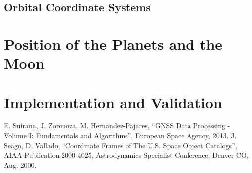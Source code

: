 \documentclass [12pt, a4paper] {article}
\begin{document}
\subsection{Orbital Coordinate Systems}

\newpage
\section{Position of the Planets and the Moon}

\newpage
\section{Implementation and Validation}

\newpage
\begin{thebibliography}{1}
  E. Suirana, J. Zoronoza, M. Hernandez-Pajares,
  ``GNSS Data Processing - Volume I: Fundamentals and Algorithms'',
  European Space Agency, 2013.
  J. Seago, D. Vallado,
  ``Coordinate Frames of The U.S. Space Object Catalogs'',
  AIAA Publication 2000-4025,
  Astrodynamics Specialist Conference, Denver CO, Aug. 2000.
\end{thebibliography}  
\end{document}
